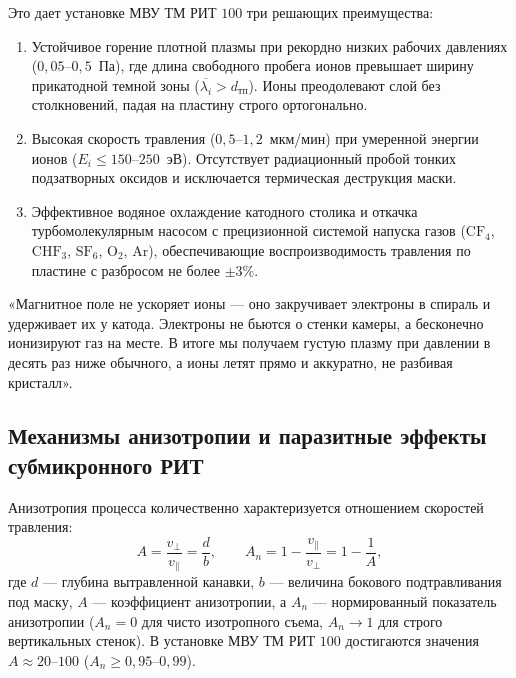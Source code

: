 \documentclass[12pt,a4paper]{article}
\theoremstyle{plain}
\theoremstyle{definition}
\theoremstyle{remark}
\numberwithin{equation}{section}
\begin{document}
Это дает установке МВУ ТМ РИТ $100$ три решающих преимущества:
\begin{enumerate}
  \item Устойчивое горение плотной плазмы при рекордно низких рабочих давлениях ($0{,}05\text{--}0{,}5$~Па), где длина свободного пробега ионов превышает ширину прикатодной темной зоны ($\overline{\lambda_i} > d_\text{тп}$). Ионы преодолевают слой без столкновений, падая на пластину строго ортогонально.
  \item Высокая скорость травления ($0{,}5\text{--}1{,}2$~мкм/мин) при умеренной энергии ионов ($E_i \le 150\text{--}250$~эВ). Отсутствует радиационный пробой тонких подзатворных оксидов и исключается термическая деструкция маски.
  \item Эффективное водяное охлаждение катодного столика и откачка турбомолекулярным насосом с прецизионной системой напуска газов ($\mathrm{CF}_4$, $\mathrm{CHF}_3$, $\mathrm{SF}_6$, $\mathrm{O}_2$, $\mathrm{Ar}$), обеспечивающие воспроизводимость травления по пластине с разбросом не более $\pm 3\%$.
\end{enumerate}

«Магнитное поле не ускоряет ионы — оно закручивает электроны в спираль и удерживает их у катода. Электроны не бьются о стенки камеры, а бесконечно ионизируют газ на месте. В итоге мы получаем густую плазму при давлении в десять раз ниже обычного, а ионы летят прямо и аккуратно, не разбивая кристалл».

\subsection{Механизмы анизотропии и паразитные эффекты субмикронного РИТ}

Анизотропия процесса количественно характеризуется отношением скоростей травления:
\begin{equation*}
  A = \frac{v_\perp}{v_\parallel} = \frac{d}{b}, \qquad A_n = 1 - \frac{v_\parallel}{v_\perp} = 1 - \frac{1}{A},
\end{equation*}
где $d$ — глубина вытравленной канавки, $b$ — величина бокового подтравливания под маску, $A$ — коэффициент анизотропии, а $A_n$ — нормированный показатель анизотропии ($A_n = 0$ для чисто изотропного съема, $A_n \to 1$ для строго вертикальных стенок). В установке МВУ ТМ РИТ $100$ достигаются значения $A \approx 20\text{--}100$ ($A_n \ge 0{,}95\text{--}0{,}99$).
\end{document}

